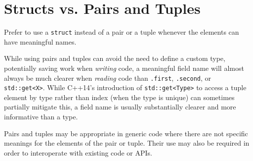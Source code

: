
\section{Structs vs. Pairs and Tuples}\label{sec:structs-vs.-pairs-and-tuples}
Prefer to use a \texttt{struct} instead of a pair or a tuple whenever the elements can have meaningful names.

While using pairs and tuples can avoid the need to define a custom type, potentially saving work when \emph{writing} code, a meaningful field name will almost always be much clearer when \emph{reading} code than \texttt{.first}, \texttt{.second}, or \texttt{std::get<X>}. While C++14's introduction of \texttt{std::get<Type>} to access a tuple element by type rather than index (when the type is unique) can sometimes partially mitigate this, a field name is usually substantially clearer and more informative than a type.

Pairs and tuples may be appropriate in generic code where there are not specific meanings for the elements of the pair or tuple. Their use may also be required in order to interoperate with existing code or APIs.
